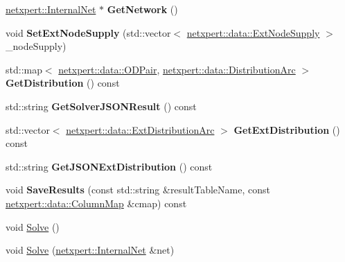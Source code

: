 \begin{DoxyCompactItemize}
\item 
\hyperlink{classnetxpert_1_1InternalNet}{netxpert\+::\+Internal\+Net} $\ast$ {\bfseries Get\+Network} ()\hypertarget{classnetxpert_1_1Transportation_a404f8bbde60346861a1885b43a591ba8}{}\label{classnetxpert_1_1Transportation_a404f8bbde60346861a1885b43a591ba8}

\item 
void {\bfseries Set\+Ext\+Node\+Supply} (std\+::vector$<$ \hyperlink{structnetxpert_1_1data_1_1ExtNodeSupply}{netxpert\+::data\+::\+Ext\+Node\+Supply} $>$ \+\_\+node\+Supply)\hypertarget{classnetxpert_1_1Transportation_aba71c269cb507ee1575b203c13fe7898}{}\label{classnetxpert_1_1Transportation_aba71c269cb507ee1575b203c13fe7898}

\item 
std\+::map$<$ \hyperlink{structnetxpert_1_1data_1_1ODPair}{netxpert\+::data\+::\+O\+D\+Pair}, \hyperlink{structnetxpert_1_1data_1_1DistributionArc}{netxpert\+::data\+::\+Distribution\+Arc} $>$ {\bfseries Get\+Distribution} () const \hypertarget{classnetxpert_1_1Transportation_a937b20ec0d347a9950d272b931d1a312}{}\label{classnetxpert_1_1Transportation_a937b20ec0d347a9950d272b931d1a312}

\item 
std\+::string {\bfseries Get\+Solver\+J\+S\+O\+N\+Result} () const \hypertarget{classnetxpert_1_1Transportation_a8f902b10f9b0577029a125177c428f3c}{}\label{classnetxpert_1_1Transportation_a8f902b10f9b0577029a125177c428f3c}

\item 
std\+::vector$<$ \hyperlink{structnetxpert_1_1data_1_1ExtDistributionArc}{netxpert\+::data\+::\+Ext\+Distribution\+Arc} $>$ {\bfseries Get\+Ext\+Distribution} () const \hypertarget{classnetxpert_1_1Transportation_a53c91ad46f2ed5e2f2505d1a3d3c07fb}{}\label{classnetxpert_1_1Transportation_a53c91ad46f2ed5e2f2505d1a3d3c07fb}

\item 
std\+::string {\bfseries Get\+J\+S\+O\+N\+Ext\+Distribution} () const \hypertarget{classnetxpert_1_1Transportation_a3d7ada6b7c52f0c7e0ecf7cd4d795ff5}{}\label{classnetxpert_1_1Transportation_a3d7ada6b7c52f0c7e0ecf7cd4d795ff5}

\item 
void {\bfseries Save\+Results} (const std\+::string \&result\+Table\+Name, const \hyperlink{structnetxpert_1_1data_1_1ColumnMap}{netxpert\+::data\+::\+Column\+Map} \&cmap) const \hypertarget{classnetxpert_1_1Transportation_a5d79b20079a47ea164b692c7f2eed669}{}\label{classnetxpert_1_1Transportation_a5d79b20079a47ea164b692c7f2eed669}

\item 
void \hyperlink{classnetxpert_1_1Transportation_ac8b5f46f7332efb23cf4ef7add462b2b}{Solve} ()
\item 
void \hyperlink{classnetxpert_1_1Transportation_ada422481bba50b142ea0a5a73c29d276}{Solve} (\hyperlink{classnetxpert_1_1InternalNet}{netxpert\+::\+Internal\+Net} \&net)
\end{DoxyCompactItemize}

